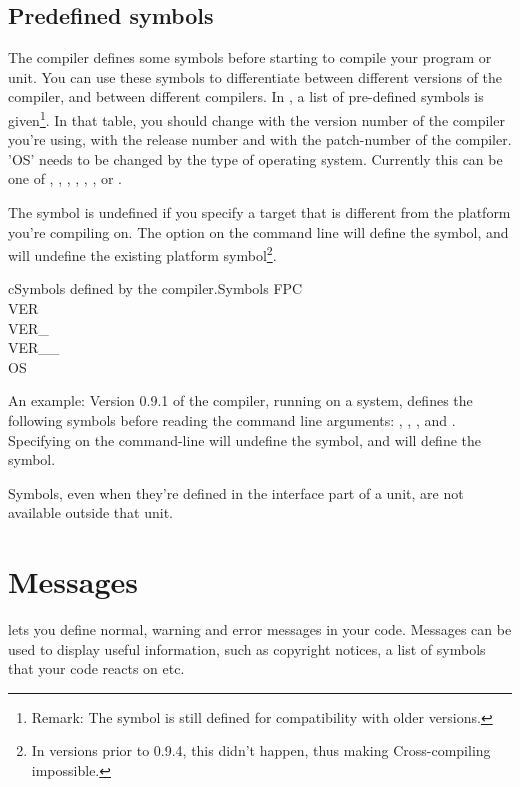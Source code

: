 \subsection{Predefined symbols}

The \fpc compiler defines some symbols before starting to compile your
program or unit. You can use these symbols to differentiate between
different versions of the compiler, and between different compilers.
In , a list of pre-defined symbols is given\footnote{Remark:
The  symbol is still defined for compatibility with older versions.}. In that table,
you should change  with the version number of the compiler
you're using,  with the release number and 
with the patch-number of the compiler. 'OS' needs to be changed by the type
of operating system. Currently this can be one of , ,
, , , ,  or .

The  symbol is undefined if you specify a target that is different from the
platform you're compiling on.
The  option on the command line will define the  symbol,
and will undefine the existing platform symbol\footnote{In versions prior to
0.9.4, this didn't happen, thus making Cross-compiling impossible.}.

\begin{FPCltable}{c}{Symbols defined by the compiler.}{Symbols} \hline
FPC \\
VER \\
VER\_ \\
VER\_\_ \\
OS \\ \hline
\end{FPCltable}

An example: Version 0.9.1 of the compiler, running on a \linux system,
defines the following symbols before reading the command line arguments:
, , ,  and .
Specifying  on the command-line will undefine the 
symbol, and will define the  symbol.

\begin{remark}Symbols, even when they're defined in the interface part of
a unit, are not available outside that unit.
\end{remark}


\section{Messages}
\label{se:Messages}
\fpc lets you define normal, warning and error messages in your code.
Messages can be used to display useful information, such as copyright
notices, a list of symbols that your code reacts on etc.

